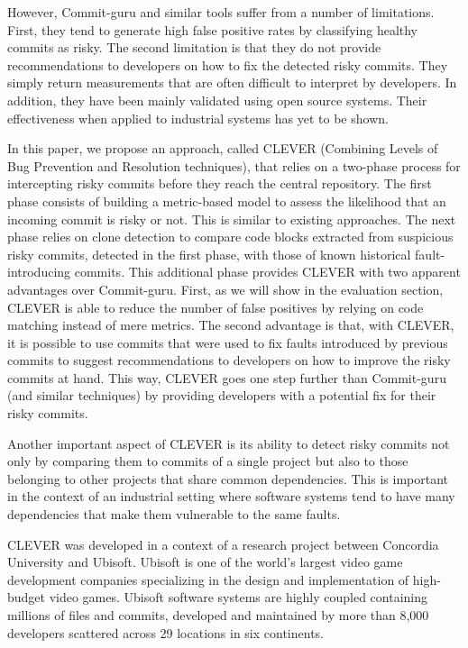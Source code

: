 \documentclass[sigconf]{acmart}
\begin{document}
However, Commit-guru and similar tools suffer from a number of
limitations. First, they tend to generate high false positive rates by
classifying healthy commits as risky. The second limitation is that they
do not provide recommendations to developers on how to fix the detected
risky commits. They simply return measurements that are often difficult
to interpret by developers. In addition, they have been mainly validated
using open source systems. Their effectiveness when applied to
industrial systems has yet to be shown.

In this paper, we propose an approach, called CLEVER (Combining Levels
of Bug Prevention and Resolution techniques), that relies on a two-phase
process for intercepting risky commits before they reach the central
repository. The first phase consists of building a metric-based model to
assess the likelihood that an incoming commit is risky or not. This is
similar to existing approaches. The next phase relies on clone detection
to compare code blocks extracted from suspicious risky commits, detected
in the first phase, with those of known historical fault-introducing
commits. This additional phase provides CLEVER with two apparent
advantages over Commit-guru. First, as we will show in the evaluation
section, CLEVER is able to reduce the number of false positives by
relying on code matching instead of mere metrics. The second advantage
is that, with CLEVER, it is possible to use commits that were used to
fix faults introduced by previous commits to suggest recommendations to
developers on how to improve the risky commits at hand. This way, CLEVER
goes one step further than Commit-guru (and similar techniques) by
providing developers with a potential fix for their risky commits.

Another important aspect of CLEVER is its ability to detect risky
commits not only by comparing them to commits of a single project but
also to those belonging to other projects that share common
dependencies. This is important in the context of an industrial setting
where software systems tend to have many dependencies that make them
vulnerable to the same faults.

CLEVER was developed in a context of a research project between
Concordia University and Ubisoft. Ubisoft is one of the world's largest
video game development companies specializing in the design and
implementation of high-budget video games. Ubisoft software systems are
highly coupled containing millions of files and commits, developed and
maintained by more than 8,000 developers scattered across 29 locations
in six continents.
\end{document}

